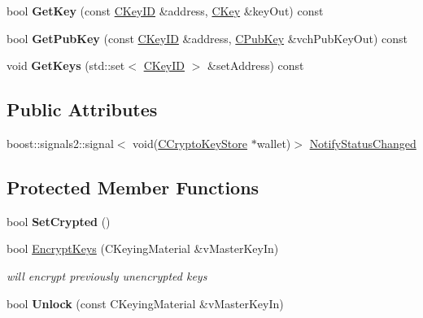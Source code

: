 \begin{DoxyCompactItemize}
\mbox{\label{class_c_crypto_key_store_af46ec271fffb65a113702ba40a3738c8}} 
bool {\bfseries Get\+Key} (const \mbox{\hyperlink{class_c_key_i_d}{C\+Key\+ID}} \&address, \mbox{\hyperlink{class_c_key}{C\+Key}} \&key\+Out) const
\item 
\mbox{\label{class_c_crypto_key_store_a20b474adfe6900bb36cd4fd6f9c31380}} 
bool {\bfseries Get\+Pub\+Key} (const \mbox{\hyperlink{class_c_key_i_d}{C\+Key\+ID}} \&address, \mbox{\hyperlink{class_c_pub_key}{C\+Pub\+Key}} \&vch\+Pub\+Key\+Out) const
\item 
\mbox{\label{class_c_crypto_key_store_a84e2fb905745176ab784c3413520e46f}} 
void {\bfseries Get\+Keys} (std\+::set$<$ \mbox{\hyperlink{class_c_key_i_d}{C\+Key\+ID}} $>$ \&set\+Address) const
\end{DoxyCompactItemize}
\subsection*{Public Attributes}
\begin{DoxyCompactItemize}
\item 
boost\+::signals2\+::signal$<$ void(\mbox{\hyperlink{class_c_crypto_key_store}{C\+Crypto\+Key\+Store}} $\ast$wallet)$>$ \mbox{\hyperlink{class_c_crypto_key_store_aeeb1c466663df6be9be54b1833e0f888}{Notify\+Status\+Changed}}
\end{DoxyCompactItemize}
\subsection*{Protected Member Functions}
\begin{DoxyCompactItemize}
\item 
\mbox{\label{class_c_crypto_key_store_af202f587051735be5a39344d9e333720}} 
bool {\bfseries Set\+Crypted} ()
\item 
\mbox{\label{class_c_crypto_key_store_a8c0f6b63fb04193df16243c4459b7c61}} 
bool \mbox{\hyperlink{class_c_crypto_key_store_a8c0f6b63fb04193df16243c4459b7c61}{Encrypt\+Keys}} (C\+Keying\+Material \&v\+Master\+Key\+In)
\begin{DoxyCompactList}\small\item\em will encrypt previously unencrypted keys \end{DoxyCompactList}\item 
\mbox{\label{class_c_crypto_key_store_a81bd70e18aa75f566526620a74f9cd88}} 
bool {\bfseries Unlock} (const C\+Keying\+Material \&v\+Master\+Key\+In)
\end{DoxyCompactItemize}
